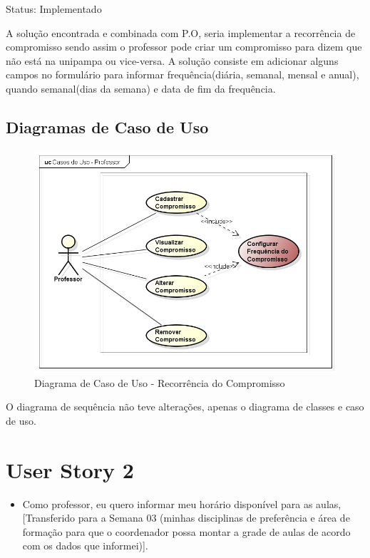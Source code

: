 \documentclass{abnt}
\begin{document}
		Status: Implementado
		
		A solução encontrada e combinada com P.O, seria implementar a recorrência de compromisso sendo assim o professor pode criar um compromisso para dizem que não está na unipampa ou vice-versa. A solução consiste em adicionar alguns campos no formulário para informar frequência(diária, semanal, mensal e anual), quando semanal(dias da semana) e data de fim da frequência.
		
		\subsection{Diagramas de Caso de Uso}	
		\begin{figure}[h]
			\begin{center}
				 \includegraphics[width=500px]{CasoUsoDiasAusencia}
				 \caption{Diagrama de Caso de Uso - Recorrência do Compromisso}
				 \label{fig:CasoUsoDiasAusencia}
			\end{center}
		\end{figure}
		\FloatBarrier
		
		O diagrama de sequência não teve alterações, apenas o diagrama de classes e caso de uso.
		
	
	\clearpage	
	\section{User Story 2}

		\begin{itemize}
			\item Como professor, eu quero informar meu horário disponível para as aulas, [Transferido para a Semana 03 (minhas disciplinas de preferência 
			e área de formação para que o coordenador possa montar a grade de aulas de acordo com os dados que informei)].
		\end{itemize}
		
\end{document}
